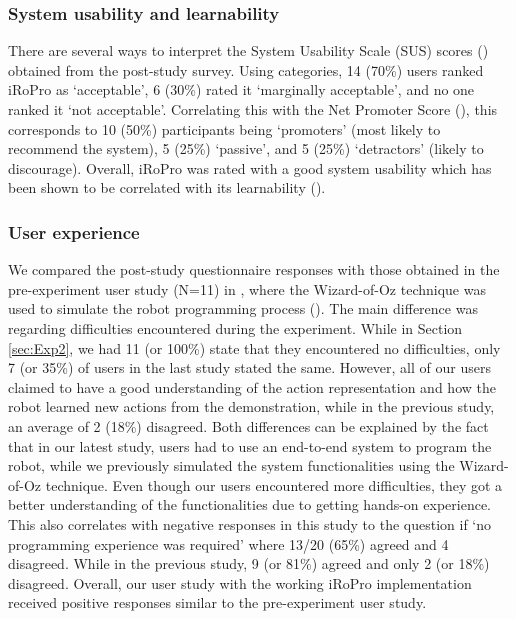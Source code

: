 
\subsubsection*{System usability and learnability} 
There are several ways to interpret the System Usability Scale (SUS) scores (\cite{brooke2013sus}) obtained from the post-study survey. 
Using \citet{bangor2008suseval} categories, 14 (70\%) users ranked iRoPro as `acceptable', 6 (30\%) rated it `marginally acceptable', and no one ranked it `not acceptable'.
Correlating this with the Net Promoter Score (\cite{nps}), this corresponds to 10 (50\%) participants being `promoters' (most likely to recommend the system), 5 (25\%) `passive', and 5 (25\%) `detractors' (likely to discourage).
Overall, iRoPro was rated with a good system usability which has been shown to be correlated with its learnability (\cite{borsci2009dimensionality,sauro2011practical}).

\subsubsection*{User experience} 
We compared the post-study questionnaire responses with those obtained in the pre-experiment user study (N=11) in , where the Wizard-of-Oz technique was used to simulate the robot programming process (). 
The main difference was regarding difficulties encountered during the experiment.
While in Section \ref{sec:Exp2}, we had 11 (or 100\%) state that they encountered no difficulties, only 7 (or 35\%) of users in the last study stated the same.
However, all of our users claimed to have a good understanding of the action representation and how the robot learned new actions from the demonstration, while in the previous study, an average of 2 (18\%) disagreed.
Both differences can be explained by the fact that in our latest study, users had to use an end-to-end system to program the robot, while we previously simulated the system functionalities using the Wizard-of-Oz technique.
Even though our users encountered more difficulties, they got a better understanding of the functionalities due to getting hands-on experience.
This also correlates with negative responses in this study to the question if `no programming experience was required' where 13/20 (65\%) agreed and 4 disagreed. 
While in the previous study, 9 (or 81\%) agreed and only 2 (or 18\%) disagreed.
Overall, our user study with the working iRoPro implementation received positive responses similar to the pre-experiment user study.

